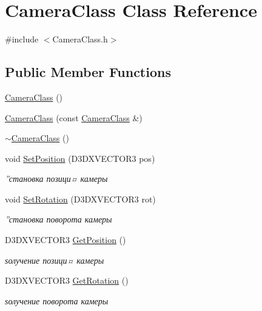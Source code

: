 \hypertarget{class_camera_class}{}\section{Camera\+Class Class Reference}
\label{class_camera_class}


{\ttfamily \#include $<$Camera\+Class.\+h$>$}

\subsection*{Public Member Functions}
\begin{DoxyCompactItemize}
\item 
\hyperlink{class_camera_class_aafa301844b0e5e6cfb84eb718e5a8cb7}{Camera\+Class} ()
\item 
\hyperlink{class_camera_class_a297352fa77e8e6ceeb2c0825c71b67a5}{Camera\+Class} (const \hyperlink{class_camera_class}{Camera\+Class} \&)
\item 
\hyperlink{class_camera_class_a76d3bae304d885a19839ea93ba3c582d}{$\sim$\+Camera\+Class} ()
\item 
void \hyperlink{class_camera_class_aa3468055eb8fa3aeb552aee73bacd2e1}{Set\+Position} (D3\+D\+X\+V\+E\+C\+T\+O\+R3 pos)
\begin{DoxyCompactList}\small\item\em ”становка позици¤ камеры \end{DoxyCompactList}\item 
void \hyperlink{class_camera_class_acb932c2317f88ba63f4a95f854ef1120}{Set\+Rotation} (D3\+D\+X\+V\+E\+C\+T\+O\+R3 rot)
\begin{DoxyCompactList}\small\item\em ”становка поворота камеры \end{DoxyCompactList}\item 
D3\+D\+X\+V\+E\+C\+T\+O\+R3 \hyperlink{class_camera_class_a4a775d2e98bec6a3f6d8020e396cc3ea}{Get\+Position} ()
\begin{DoxyCompactList}\small\item\em ѕолучение позици¤ камеры \end{DoxyCompactList}\item 
D3\+D\+X\+V\+E\+C\+T\+O\+R3 \hyperlink{class_camera_class_ac982d11ed6b941665a53314334e87e33}{Get\+Rotation} ()
\begin{DoxyCompactList}\small\item\em ѕолучение поворота камеры \end{DoxyCompactList}\item 

\end{DoxyCompactItemize}
